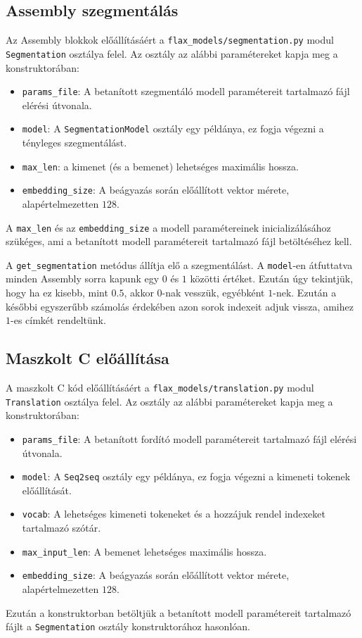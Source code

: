 \subsection{Assembly szegmentálás}
Az Assembly blokkok előállításáért a \texttt{flax\_models/segmentation.py} modul \texttt{Segmentation} osztálya
felel. Az osztály az alábbi paramétereket kapja meg a konstruktorában:
\begin{itemize}
    \item \texttt{params\_file}: A betanított szegmentáló modell paramétereit tartalmazó fájl elérési útvonala.
    \item \texttt{model}: A \texttt{SegmentationModel} osztály egy példánya, ez fogja végezni a tényleges
        szegmentálást.
    \item \texttt{max\_len}: a kimenet (és a bemenet) lehetséges maximális hossza.
    \item \texttt{embedding\_size}: A beágyazás során előállított vektor mérete, alapértelmezetten $128$.
\end{itemize}
A \texttt{max\_len} és az \texttt{embedding\_size} a modell paramétereinek inicializálásához szükéges, ami
a betanított modell paramétereit tartalmazó fájl betöltéséhez kell.

A \texttt{get\_segmentation} metódus állítja elő a szegmentálást. A \texttt{model}-en átfuttatva minden Assembly
sorra kapunk egy $0$ és $1$ közötti értéket. Ezután úgy tekintjük, hogy ha ez kisebb, mint $0.5$, akkor $0$-nak
vesszük, egyébként $1$-nek. Ezután a későbbi egyszerűbb számolás érdekében azon sorok indexeit adjuk vissza,
amihez $1$-es címkét rendeltünk.

\subsection{Maszkolt C előállítása}
A maszkolt C kód előállításáért a \texttt{flax\_models/translation.py} modul \texttt{Translation} osztálya
felel. Az osztály az alábbi paramétereket kapja meg a konstruktorában:
\begin{itemize}
    \item \texttt{params\_file}: A betanított fordító modell paramétereit tartalmazó fájl elérési útvonala.
    \item \texttt{model}: A \texttt{Seq2seq} osztály egy példánya, ez fogja végezni a kimeneti tokenek előállítását.
    \item \texttt{vocab}: A lehetséges kimeneti tokeneket és a hozzájuk rendel indexeket tartalmazó szótár.
    \item \texttt{max\_input\_len}: A bemenet lehetséges maximális hossza.
    \item \texttt{embedding\_size}: A beágyazás során előállított vektor mérete, alapértelmezetten $128$.
\end{itemize}
Ezután a konstruktorban betöltjük a betanított modell paramétereit tartalmazó fájlt a \texttt{Segmentation}
osztály konstruktorához hasonlóan.

